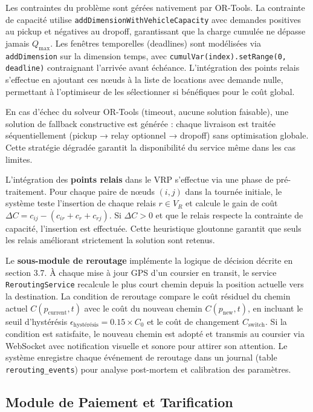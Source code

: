 Les contraintes du problème sont gérées nativement par OR-Tools. La contrainte de capacité utilise \texttt{addDimensionWithVehicleCapacity} avec demandes positives au pickup et négatives au dropoff, garantissant que la charge cumulée ne dépasse jamais $Q_{\max}$. Les fenêtres temporelles (deadlines) sont modélisées via \texttt{addDimension} sur la dimension temps, avec \texttt{cumulVar(index).setRange(0, deadline)} contraignant l'arrivée avant échéance. L'intégration des points relais s'effectue en ajoutant ces nœuds à la liste de locations avec demande nulle, permettant à l'optimiseur de les sélectionner si bénéfiques pour le coût global.

En cas d'échec du solveur OR-Tools (timeout, aucune solution faisable), une solution de fallback constructive est générée : chaque livraison est traitée séquentiellement (pickup → relay optionnel → dropoff) sans optimisation globale. Cette stratégie dégradée garantit la disponibilité du service même dans les cas limites.

L'intégration des \textbf{points relais} dans le VRP s'effectue via une phase de pré-traitement. Pour chaque paire de nœuds $(i,j)$ dans la tournée initiale, le système teste l'insertion de chaque relais $r \in V_R$ et calcule le gain de coût $\Delta C = c_{ij} - (c_{ir} + c_r + c_{rj})$. Si $\Delta C > 0$ et que le relais respecte la contrainte de capacité, l'insertion est effectuée. Cette heuristique gloutonne garantit que seuls les relais améliorant strictement la solution sont retenus.

Le \textbf{sous-module de reroutage} implémente la logique de décision décrite en section 3.7. À chaque mise à jour GPS d'un coursier en transit, le service \texttt{ReroutingService} recalcule le plus court chemin depuis la position actuelle vers la destination. La condition de reroutage compare le coût résiduel du chemin actuel $C(p_{\text{current}}, t)$ avec le coût du nouveau chemin $C(p_{\text{new}}, t)$, en incluant le seuil d'hystérésis $\epsilon_{\text{hystérésis}} = 0.15 \times C_0$ et le coût de changement $C_{\text{switch}}$. Si la condition est satisfaite, le nouveau chemin est adopté et transmis au coursier via WebSocket avec notification visuelle et sonore pour attirer son attention. Le système enregistre chaque événement de reroutage dans un journal (table \texttt{rerouting\_events}) pour analyse post-mortem et calibration des paramètres.

\subsection{Module de Paiement et Tarification}

